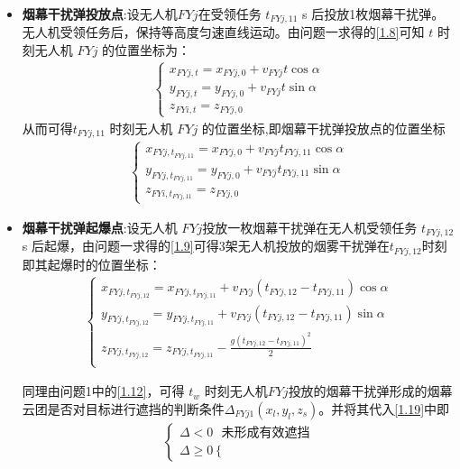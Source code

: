\documentclass[../main.tex]{subfiles}
\begin{document}
\begin{itemize}
\item \textbf{烟幕干扰弹投放点}:设无人机$FYj$在受领任务 \( t_{FYj,11} \) s 后投放1枚烟幕干扰弹。无人机受领任务后，保持等高度匀速直线运动。由问题一求得的\eqref{1.8}可知 \( t \) 时刻无人机 \( FYj \) 的位置坐标为：
\begin{align}\label{19.3}
  \begin{cases}
x_{FYj,t} = x_{FYj,0} + v_{FYj} t \cos\alpha \\
y_{FYj,t} = y_{FYj,0} + v_{FYj} t \sin\alpha \\
z_{FYi,t} = z_{FYj,0}
\end{cases}
\end{align}
从而可得\( t_{FYj,11} \) 时刻无人机 \( FYj \) 的位置坐标,即烟幕干扰弹投放点的位置坐标
\begin{align}
  \begin{cases}
x_{FYj,t_{FYj,11}} = x_{FYj,0} + v_{FYj} t_{FYj,11} \cos\alpha \\
y_{FYj,t_{FYj,11}} = y_{FYj,0} + v_{FYj} t_{FYj,11} \sin\alpha \\
z_{FYi,t_{FYj,11}} = z_{FYj,0}
\end{cases}
\end{align}
\item \textbf{烟幕干扰弹起爆点}:设无人机 $FYj $投放一枚烟幕干扰弹在无人机受领任务 \( t_{FYj,12} \) s 后起爆，由问题一求得的\eqref{1.9}可得3架无人机投放的烟雾干扰弹在$t_{FYj,12}$时刻即其起爆时的位置坐标：
\begin{align}\label{19.4}
\left\{ \begin{array}{l}
	x_{FYj,t_{FYj,12}}=x_{FYj,t_{FYj,11}}+v_{FYj}\left( t_{FYj,12}-t_{FYj,11} \right) \cos \alpha\\
	y_{FYj,t_{FYj,12}}=y_{FYj,t_{FYj,11}}+v_{FYj}\left( t_{FYj,12}-t_{FYj,11} \right) \sin \alpha\\
	z_{FYj,t_{FYj,12}}=z_{FYj,t_{FYj,11}}-\frac{g\left( t_{FYj,12}-t_{FYj,11} \right) ^2}{2}\\
\end{array} \right. 
\end{align}
\par 同理由问题1中的\eqref{1.12}，可得 $t_w$ 时刻无人机$FYj$投放的烟幕干扰弹形成的烟幕云团是否对目标进行遮挡的判断条件$\Delta _{FYj1}\left( x_l,y_l,z_s \right) $。并将其代入\eqref{1.19}中即
\begin{align}\label{1.98}
	\left\{ \begin{array}{l}
	\varDelta <0\ \ \ \text{未形成有效遮挡}\\
	\varDelta \ge 0\left\{ \begin{array}{l}

\end{array}
\end{array}
\end{align}
\end{itemize}
\end{document}
